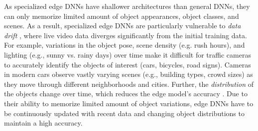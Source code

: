 

 As specialized edge DNNs have shallower architectures than general DNNs, they can only memorize limited amount of object appearances, object classes, and scenes. As a result, specialized edge DNNs are particularly vulnerable to {\em data drift} \cite{datadrift-7, datadrift-8, datadrift-a, datadrift-b}, where live video data diverges significantly from the initial training data. For example, variations in the object pose, scene density (e.g. rush hours), and lighting (e.g., sunny vs. rainy days) over time make it difficult for traffic cameras to accurately identify the objects of interest (cars, bicycles, road signs). Cameras in modern cars observe vastly varying scenes (e.g., building types, crowd sizes) as they move through different neighborhoods and cities. Further, the {\em distribution} of the objects change over time, which reduces the edge model's accuracy \cite{distribution-20, distribution-21}. Due to their ability to memorize limited amount of object variations, edge DNNs have to be continuously updated with recent data and changing object distributions to maintain a high accuracy.  %

